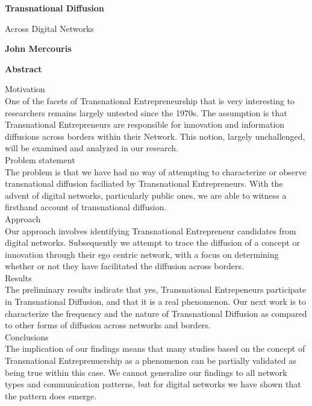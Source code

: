 \thispagestyle{plain}
\begin{center}
    \Large
    \textbf{Transnational Diffusion}
    
    \vspace{0.4cm}
    \large
    Across Digital Networks
    
    \vspace{0.4cm}
    \textbf{John Mercouris}
    
    \vspace{0.9cm}
    \textbf{Abstract}
\end{center}

Motivation
\\
One of the facets of Transnational Entrepreneurship that is very interesting to researchers remains largely untested since the 1970s. The assumption is that Transnational Entrepreneurs are responsible for innovation and information diffusions across borders within their Network. This notion, largely unchallenged, will be examined and analyzed in our research.
\\

Problem statement
\\
The problem is that we have had no way of attempting to characterize or observe transnational diffusion faciliated by Transnational Entrepreneurs. With the advent of digital networks, particularly public ones, we are able to witness a firsthand account of transnational diffusion.
\\

Approach
\\
Our approach involves identifying Transnational Entrepreneur candidates from digital networks. Subsequently we attempt to trace the diffusion of a concept or innovation through their ego centric network, with a focus on determining whether or not they have facilitated the diffusion across borders.
\\

Results
\\
The preliminary results indicate that yes, Transnational Entrepeneurs participate in Transnational Diffusion, and that it is a real phenomenon. Our next work is to characterize the frequency and the nature of Transnational Diffusion as compared to other forms of diffusion across networks and borders.
\\

Conclusions
\\
The implication of our findings means that many studies based on the concept of Transnational Entreprenuership as a phenomenon can be partially validated as being true within this case. We cannot generalize our findings to all network types and communication patterns, but for digital networks we have shown that the pattern does emerge.
\\







